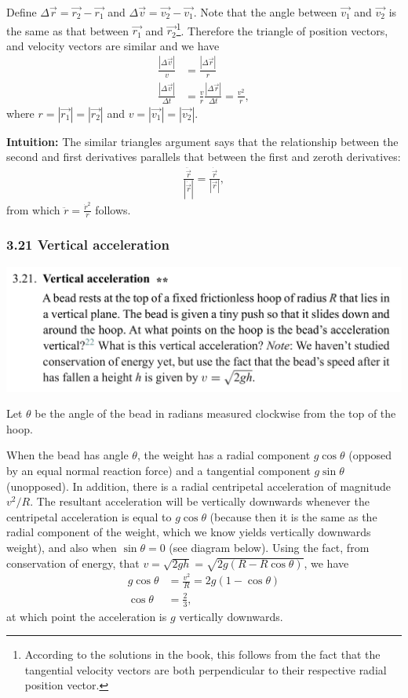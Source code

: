Define $\Delta \vec{r} = \vec{r_2} - \vec{r_1}$ and $\Delta \vec{v} = \vec{v_2} - \vec{v_1}$.  Note
that the angle between $\vec{v_1}$ and $\vec{v_2}$ is the same as that between $\vec{r_1}$ and
$\vec{r_2}$\footnote{According to the solutions in the book, this follows from the fact that the
  tangential velocity vectors are both perpendicular to their respective radial position
  vector.}. Therefore the triangle of position vectors, and velocity vectors are similar and we have
\begin{align*}
  \frac{|\Delta \vec{v}|}{v} &= \frac{|\Delta \vec{r}|}{r} \\
  \frac{|\Delta \vec{v}|}{\Delta t} &= \frac{v}{r}\frac{|\Delta \vec{r}|}{\Delta t} = \frac{v^2}{r},
\end{align*}
where $r = |\vec{r_1}| = |\vec{r_2}|$ and $v = |\vec{v_1}| = |\vec{v_2}|$.

{\bf Intuition:} The similar triangles argument says that the relationship between the second and
first derivatives parallels that between the first and zeroth derivatives:
\begin{align*}
  \frac{\ddot{\vec{r}}}{|\dot{\vec{r}}|} = \frac{\dot{\vec{r}}}{|\vec{r}|},
\end{align*}
from which $\ddot{r} = \frac{\dot{r}^2}{r}$ follows.


\subsubsection*{3.21 Vertical acceleration}
\begin{mdframed}
  \includegraphics[width=400pt]{img/physics--classical-mechanics--morin--3-21.png}
\end{mdframed}

Let $\theta$ be the angle of the bead in radians measured clockwise from the top of the hoop.

When the bead has angle $\theta$, the weight has a radial component $g\cos\theta$ (opposed by an
equal normal reaction force) and a tangential component $g\sin\theta$ (unopposed). In addition,
there is a radial centripetal acceleration of magnitude $v^2/R$. The resultant acceleration will be
vertically downwards whenever the centripetal acceleration is equal to $g\cos\theta$ (because then
it is the same as the radial component of the weight, which we know yields vertically downwards
weight), and also when $\sin\theta=0$ (see diagram below). Using the fact, from conservation of
energy, that $v = \sqrt{2gh} = \sqrt{2g(R - R\cos\theta)}$, we have
\begin{align*}
  g\cos\theta  &= \frac{v^2}{R} =2g(1 - \cos\theta)\\
  \cos\theta &= \frac{2}{3},
\end{align*}
at which point the acceleration is $g$ vertically downwards. \correct

